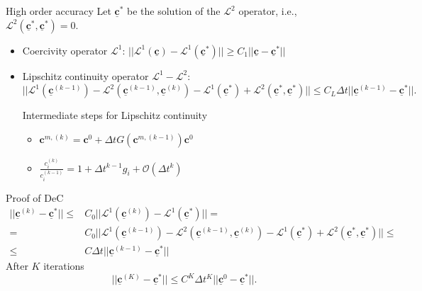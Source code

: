 \documentclass[aspectratio=169]{beamer}
\newcommand{\Ol}{\mathcal{O}}
\newcommand{\1}{\begin{pmatrix}
                 1\\
                 1
                \end{pmatrix}}
\def\L{\mathcal{L}}
\def\bbc{\underline{\mathbf{c}}}
\def\bc{\mathbf{c}}
\begin{document}
\begin{frame}{High order accuracy}
Let $\bbc^*$ be the solution of the $\L^2$ operator, i.e., $\L^2(\bbc^*,\bbc^*)=0$.
\begin{itemize}
\item Coercivity operator $\L^1$: $||\L^1(\bbc)-\L^1(\bbc^*) ||\geq C_1||\bbc -\bbc^*||$ 
\item Lipschitz continuity operator $\L^1 - \L^2$:\\
$||\L^1 (\bbc^{(k-1)}) -\L^2 (\bbc^{(k-1)}, \bbc^{(k)}) -\L^1 ( \bbc^*) +\L^2 (\bbc^*,\bbc^*)||\leq C_L \Delta t ||\bbc^{(k-1)} -\bbc^*|| .$

\vspace{5mm}
Intermediate steps for Lipschitz continuity
\begin{itemize}
\item $
\bc^{m,(k)}=\bc^0 + \Delta t G(\bc^{m,(k-1)}) \bc^0
$
\item  $
  \frac{c_i^{(k)}}{c_i^{(k-1)}} =1+\Delta t^{k-1}g_i +\Ol(\Delta t^k)
 $
\end{itemize}

\end{itemize}

\end{frame}

\begin{frame}{Proof of DeC}
\begin{align}
||\bbc^{(k)}-\bbc^*||\leq & C_0|| \L^1(\bbc^{(k)}) - \L^1(\bbc^*) ||= \label{eq:coercivity}\\
= & C_0|| \L^1(\bbc^{(k-1)}) -\L^2(\bbc^{(k-1)}, \bbc^{(k)}) - \L^1(\bbc^*) +\L^2(\bbc^*, \bbc^*) ||\leq \label{eq:same_states}\\
\leq & C \Delta t || \bbc^{(k-1)}- \bbc^* || \label{eq:lipschitz}
\end{align}
After $K$ iterations 
\begin{equation}
||\bbc^{(K)}-\bbc^*||\leq C^K \Delta t^K ||\bbc^0 -\bbc^*||.
\end{equation}

\end{frame}
\end{document}
